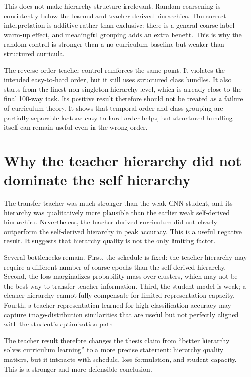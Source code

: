\documentclass[english,master,a4paper,oneside]{ppfcmthesis}
\begin{document}
This does not make hierarchy structure irrelevant. Random coarsening is
consistently below the learned and teacher-derived hierarchies. The correct
interpretation is additive rather than exclusive: there is a general
coarse-label warm-up effect, and meaningful grouping adds an extra benefit. This
is why the random control is stronger than a no-curriculum baseline but weaker
than structured curricula.

The reverse-order teacher control reinforces the same point. It violates the
intended easy-to-hard order, but it still uses structured class bundles. It also
starts from the finest non-singleton hierarchy level, which is already close to
the final 100-way task. Its positive result therefore should not be treated as a
failure of curriculum theory. It shows that temporal order and class grouping
are partially separable factors: easy-to-hard order helps, but structured
bundling itself can remain useful even in the wrong order.

\section{Why the teacher hierarchy did not dominate the self hierarchy}

The transfer teacher was much stronger than the weak CNN student, and its
hierarchy was qualitatively more plausible than the earlier weak self-derived
hierarchies. Nevertheless, the teacher-derived curriculum did not clearly
outperform the self-derived hierarchy in peak accuracy. This is a useful negative result.
It suggests that hierarchy quality is not the only limiting factor.

Several bottlenecks remain. First, the schedule is fixed: the teacher hierarchy
may require a different number of coarse epochs than the self-derived hierarchy.
Second, the loss marginalizes probability mass over clusters, which may not be
the best way to transfer teacher information. Third, the student model is weak;
a cleaner hierarchy cannot fully compensate for limited representation capacity.
Fourth, a teacher representation learned for high classification accuracy may
capture image-distribution similarities that are useful but not perfectly aligned
with the student's optimization path.

The teacher result therefore changes the thesis claim from ``better hierarchy
solves curriculum learning'' to a more precise statement: hierarchy quality
matters, but it interacts with schedule, loss formulation, and student capacity.
This is a stronger and more defensible conclusion.
\end{document}

